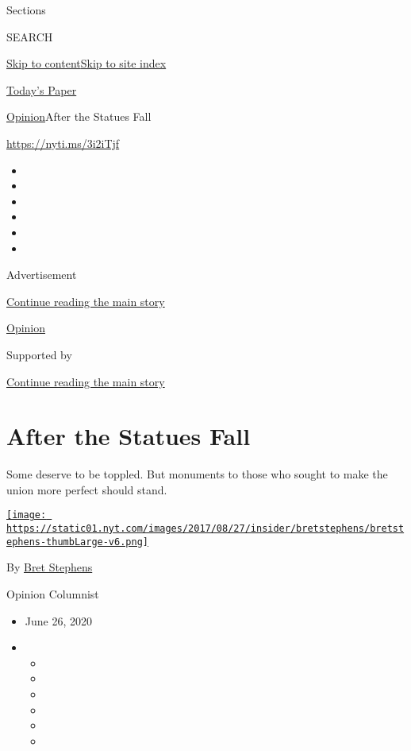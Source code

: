 Sections

SEARCH

\protect\hyperlink{site-content}{Skip to
content}\protect\hyperlink{site-index}{Skip to site index}

\href{https://myaccount.nytimes.com/auth/login?response_type=cookie\&client_id=vi}{}

\href{https://www.nytimes.com/section/todayspaper}{Today's Paper}

\href{/section/opinion}{Opinion}\textbar{}After the Statues Fall

\href{https://nyti.ms/3i2iTjf}{https://nyti.ms/3i2iTjf}

\begin{itemize}
\item
\item
\item
\item
\item
\item
\end{itemize}

Advertisement

\protect\hyperlink{after-top}{Continue reading the main story}

\href{/section/opinion}{Opinion}

Supported by

\protect\hyperlink{after-sponsor}{Continue reading the main story}

\hypertarget{after-the-statues-fall}{%
\section{After the Statues Fall}\label{after-the-statues-fall}}

Some deserve to be toppled. But monuments to those who sought to make
the union more perfect should stand.

\href{https://www.nytimes.com/by/bret-stephens}{\texttt{[image: https://static01.nyt.com/images/2017/08/27/insider/bretstephens/bretstephens-thumbLarge-v6.png]}}

By \href{https://www.nytimes.com/by/bret-stephens}{Bret Stephens}

Opinion Columnist

\begin{itemize}
\item
  June 26, 2020
\item
  \begin{itemize}
  \item
  \item
  \item
  \item
  \item
  \item
  \end{itemize}
\end{itemize}

